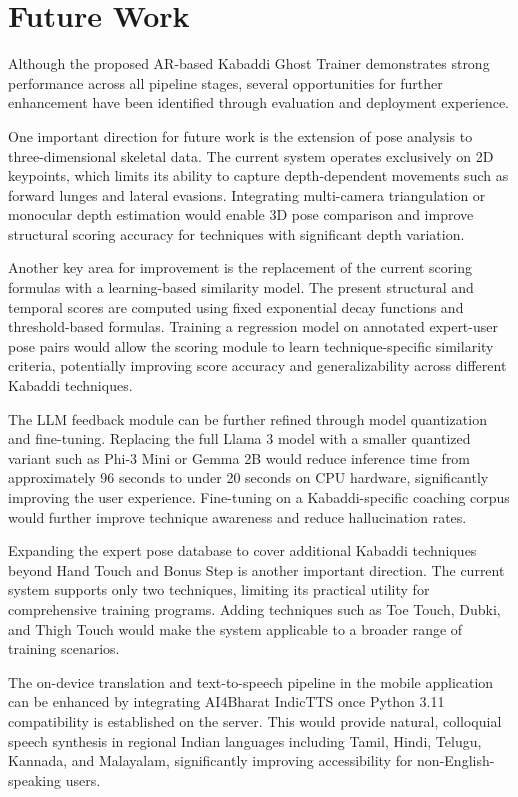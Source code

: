 \begin{sloppypar}
\section{Future Work}

Although the proposed AR-based Kabaddi Ghost Trainer demonstrates strong performance across all pipeline stages, several opportunities for further enhancement have been identified through evaluation and deployment experience.

One important direction for future work is the extension of pose analysis to three-dimensional skeletal data. The current system operates exclusively on 2D keypoints, which limits its ability to capture depth-dependent movements such as forward lunges and lateral evasions. Integrating multi-camera triangulation or monocular depth estimation would enable 3D pose comparison and improve structural scoring accuracy for techniques with significant depth variation.

Another key area for improvement is the replacement of the current scoring formulas with a learning-based similarity model. The present structural and temporal scores are computed using fixed exponential decay functions and threshold-based formulas. Training a regression model on annotated expert-user pose pairs would allow the scoring module to learn technique-specific similarity criteria, potentially improving score accuracy and generalizability across different Kabaddi techniques.

The LLM feedback module can be further refined through model quantization and fine-tuning. Replacing the full Llama 3 model with a smaller quantized variant such as Phi-3 Mini or Gemma 2B would reduce inference time from approximately 96 seconds to under 20 seconds on CPU hardware, significantly improving the user experience. Fine-tuning on a Kabaddi-specific coaching corpus would further improve technique awareness and reduce hallucination rates.

Expanding the expert pose database to cover additional Kabaddi techniques beyond Hand Touch and Bonus Step is another important direction. The current system supports only two techniques, limiting its practical utility for comprehensive training programs. Adding techniques such as Toe Touch, Dubki, and Thigh Touch would make the system applicable to a broader range of training scenarios.

The on-device translation and text-to-speech pipeline in the mobile application can be enhanced by integrating AI4Bharat IndicTTS once Python 3.11 compatibility is established on the server. This would provide natural, colloquial speech synthesis in regional Indian languages including Tamil, Hindi, Telugu, Kannada, and Malayalam, significantly improving accessibility for non-English-speaking users.


\end{sloppypar}
